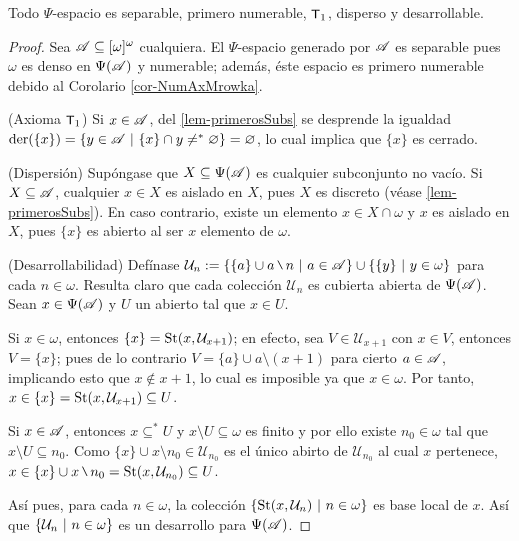 	\begin{proposicion}\label{prop-PsiSiempre}
		Todo $\Psi$-espacio es separable, primero numerable, $\text{\textsf{\small T}}_1$, disperso y desarrollable.
	\end{proposicion}
	
	\begin{proof} 
		Sea $\mathscr{A} \subseteq [\omega]^\omega$ cualquiera. El $\Psi$-espacio generado por $\mathscr{A}$ es separable pues $\omega$ es denso en $\Psi(\mathscr{A})$ y numerable; además, éste espacio es primero numerable debido al Corolario \ref{cor-NumAxMrowka}.
	
		(Axioma $\text{\textsf{\small T}}_1$) Si $x \in \mathscr{A}$, del \autoref{lem-primerosSubs} se desprende la igualdad $\operatorname{der}(\{x\})=\{y \in \mathscr{A} \text{ $|$ } \{x\} \cap y \neq^* \varnothing \}=\varnothing$, lo cual implica que $\{x\}$ es cerrado.
		
		(Dispersión) Supóngase que $X \subseteq \Psi(\mathscr{A})$ es cualquier subconjunto no vacío. Si $X \subseteq \mathscr{A}$, cualquier $x \in X$ es aislado en $X$, pues $X$ es discreto (véase \ref{lem-primerosSubs}). En caso contrario, existe un elemento $x \in X \cap \omega$ y $x$ es aislado en $X$, pues $\{x\}$ es abierto al ser $x$ elemento de $\omega$.
		
		(Desarrollabilidad) Defínase $\mathcal{U}_n:=\{ \{a\} \cup a \setminus n \tq a \in \ms{A} \} \cup \{ \{y\} \tq y \in \omega \}$ para cada $n \in \omega$. Resulta claro que cada colección $\mathcal{U}_n$ es cubierta abierta de $\Psi(\mathscr{A})$. Sean $x \in \Psi(\mathscr{A})$ y $U$ un abierto tal que $x \in U$.
		
		Si $x \in \omega$, entonces $\{x\} = \operatorname{St}(x, \mathcal{U}_{x+1})$; en efecto, sea $V \in \mathcal{U}_{x+1}$ con $x \in V$, entonces $V=\{x\}$; pues de lo contrario $V =\{a\} \cup a \setminus (x+1)$ para cierto $a \in \mathscr{A}$, implicando esto que $x \notin x+1$, lo cual es imposible ya que $x \in \omega$. Por tanto, $x \in \{x\} = \operatorname{St}(x,\mathcal{U}_{x+1}) \subseteq U$. 
		
		Si $x \in \mathscr{A}$, entonces $x \subseteq^* U$ y $x \setminus U \subseteq \omega$ es finito y por ello existe $n_0 \in \omega$ tal que $x \setminus U \subseteq n_0$. Como $\{x\} \cup x \setminus n_0 \in \mathcal{U}_{n_0}$ es el único abirto de $\mathcal{U}_{n_0}$ al cual $x$ pertenece, $x \in \{x\} \cup x \setminus n_0 = \St(x, \mathcal{U}_{n_0}) \subseteq U$.
		
		Así pues, para cada $n \in \omega$, la colección $\{\operatorname{St}(x, \mathcal{U}_n) \text{ $|$ } n \in \omega\}$ es base local de $x$. Así que $\{\mathcal{U}_n \text{ $|$ } n \in \omega \}$ es un desarrollo para $\Psi(\mathscr{A})$.
	\end{proof}
	
